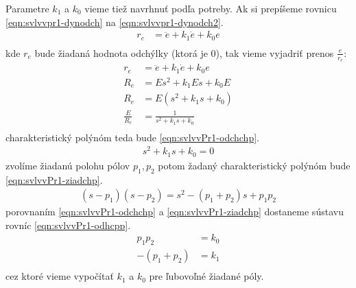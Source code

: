 \documentclass[../main.tex]{subfiles}
\begin{document}
    Parametre $k_1$ a $k_0$ vieme tiež navrhnuť podľa potreby. Ak si prepíšeme rovnicu \cref{eqn:svlvvpr1-dynodch} na \cref{eqn:svlvvpr1-dynodch2}.
    \begin{equation}
        \begin{aligned}
	        r_e &= \ddot{e}  + k_1 \dot{e} + k_0 e \\
        \end{aligned}
        \label{eqn:svlvvpr1-dynodch2}
    \end{equation} 
    kde $r_e$ bude žiadaná hodnota odchýlky (ktorá je 0), tak vieme vyjadriť prenos $\frac{e}{r_e}$:
    \begin{equation*}
        \begin{aligned}
	        r_e &= \ddot{e}  + k_1 \dot{e} + k_0 e \\
            R_e &= Es^2  + k_1Es  + k_0E  \\
            R_e &= E(s^2  + k_1s  + k_0)  \\
            \frac{E}{R_e} &= \frac{1}{s^2  + k_1s  + k_0} \\
        \end{aligned}
        \label{eqn:}
    \end{equation*} 
    charakteristický polýnóm teda bude \cref{eqn:svlvvPr1-odchchp}.
    \begin{equation}
        \begin{aligned}
            s^2  + k_1s  + k_0 = 0
        \end{aligned}
        \label{eqn:svlvvPr1-odchchp}
    \end{equation} 
    zvolíme žiadanú polohu pólov $p_1, p_2$ potom žadaný charakteristický polýnóm bude \cref{eqn:svlvvPr1-ziadchp}.
    \begin{equation}
        \begin{aligned}
            (s - p_1)(s-p_2) = s^2 - (p_1 + p_2)s + p_1p_2
        \end{aligned}
        \label{eqn:svlvvPr1-ziadchp}
    \end{equation} 
    porovnaním \cref{eqn:svlvvPr1-odchchp} a \cref{eqn:svlvvPr1-ziadchp} dostaneme sústavu rovníc \cref{eqn:svlvvPr1-odhcpp}.
    \begin{equation}
        \begin{aligned}
            p_1p_2 &= k_0 \\
            -(p_1 + p_2) &= k_1 \\
        \end{aligned}
        \label{eqn:svlvvPr1-odhcpp}
    \end{equation} 
    cez ktoré vieme vypočítať $k_1$ a $k_0$ pre ľubovoľné žiadané póly.
\end{document}

